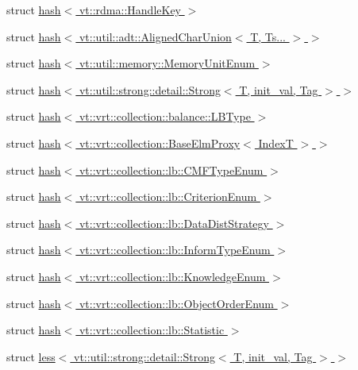 \begin{DoxyCompactItemize}
struct \hyperlink{structstd_1_1hash_3_01vt_1_1rdma_1_1_handle_key_01_4}{hash$<$ vt\+::rdma\+::\+Handle\+Key $>$}
\item 
struct \hyperlink{structstd_1_1hash_3_01vt_1_1util_1_1adt_1_1_aligned_char_union_3_01_t_00_01_ts_8_8_8_01_4_01_4}{hash$<$ vt\+::util\+::adt\+::\+Aligned\+Char\+Union$<$ T, Ts... $>$ $>$}
\item 
struct \hyperlink{structstd_1_1hash_3_01vt_1_1util_1_1memory_1_1_memory_unit_enum_01_4}{hash$<$ vt\+::util\+::memory\+::\+Memory\+Unit\+Enum $>$}
\item 
struct \hyperlink{structstd_1_1hash_3_01vt_1_1util_1_1strong_1_1detail_1_1_strong_3_01_t_00_01init__val_00_01_tag_01_4_01_4}{hash$<$ vt\+::util\+::strong\+::detail\+::\+Strong$<$ T, init\+\_\+val, Tag $>$ $>$}
\item 
struct \hyperlink{structstd_1_1hash_3_01vt_1_1vrt_1_1collection_1_1balance_1_1_l_b_type_01_4}{hash$<$ vt\+::vrt\+::collection\+::balance\+::\+L\+B\+Type $>$}
\item 
struct \hyperlink{structstd_1_1hash_3_01vt_1_1vrt_1_1collection_1_1_base_elm_proxy_3_01_index_t_01_4_01_4}{hash$<$ vt\+::vrt\+::collection\+::\+Base\+Elm\+Proxy$<$ Index\+T $>$ $>$}
\item 
struct \hyperlink{structstd_1_1hash_3_01vt_1_1vrt_1_1collection_1_1lb_1_1_c_m_f_type_enum_01_4}{hash$<$ vt\+::vrt\+::collection\+::lb\+::\+C\+M\+F\+Type\+Enum $>$}
\item 
struct \hyperlink{structstd_1_1hash_3_01vt_1_1vrt_1_1collection_1_1lb_1_1_criterion_enum_01_4}{hash$<$ vt\+::vrt\+::collection\+::lb\+::\+Criterion\+Enum $>$}
\item 
struct \hyperlink{structstd_1_1hash_3_01vt_1_1vrt_1_1collection_1_1lb_1_1_data_dist_strategy_01_4}{hash$<$ vt\+::vrt\+::collection\+::lb\+::\+Data\+Dist\+Strategy $>$}
\item 
struct \hyperlink{structstd_1_1hash_3_01vt_1_1vrt_1_1collection_1_1lb_1_1_inform_type_enum_01_4}{hash$<$ vt\+::vrt\+::collection\+::lb\+::\+Inform\+Type\+Enum $>$}
\item 
struct \hyperlink{structstd_1_1hash_3_01vt_1_1vrt_1_1collection_1_1lb_1_1_knowledge_enum_01_4}{hash$<$ vt\+::vrt\+::collection\+::lb\+::\+Knowledge\+Enum $>$}
\item 
struct \hyperlink{structstd_1_1hash_3_01vt_1_1vrt_1_1collection_1_1lb_1_1_object_order_enum_01_4}{hash$<$ vt\+::vrt\+::collection\+::lb\+::\+Object\+Order\+Enum $>$}
\item 
struct \hyperlink{structstd_1_1hash_3_01vt_1_1vrt_1_1collection_1_1lb_1_1_statistic_01_4}{hash$<$ vt\+::vrt\+::collection\+::lb\+::\+Statistic $>$}
\item 
struct \hyperlink{structstd_1_1less_3_01vt_1_1util_1_1strong_1_1detail_1_1_strong_3_01_t_00_01init__val_00_01_tag_01_4_01_4}{less$<$ vt\+::util\+::strong\+::detail\+::\+Strong$<$ T, init\+\_\+val, Tag $>$ $>$}
\end{DoxyCompactItemize}
